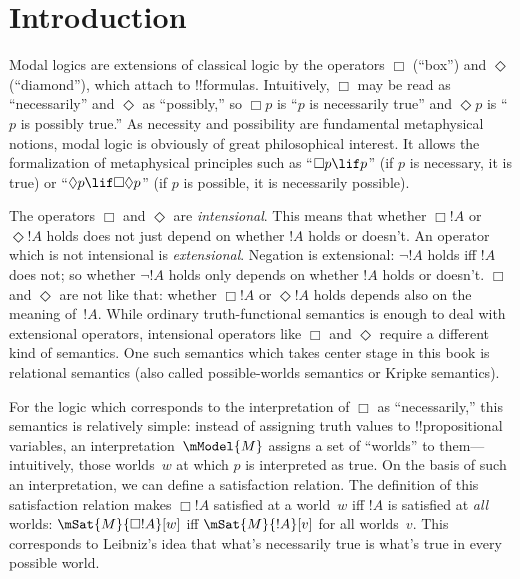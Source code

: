 
\chapter{Introduction}

Modal logics are extensions of classical logic by the operators $\Box$
(``box'') and $\Diamond$ (``diamond''), which attach to !!{formula}s.
Intuitively, $\Box$ may be read as ``necessarily'' and $\Diamond$ as
``possibly,'' so $\Box p$ is ``$p$ is necessarily true'' and $\Diamond
p$ is ``$p$ is possibly true.'' As necessity and possibility are
fundamental metaphysical notions, modal logic is obviously of great
philosophical interest. It allows the formalization of metaphysical
principles such as ``$\Box p \lif p$'' (if $p$ is necessary, it is
true) or ``$\Diamond p \lif \Box\Diamond p$'' (if $p$ is possible,
it is necessarily possible).

The operators $\Box$ and $\Diamond$ are \emph{intensional}. This means
that whether $\Box !A$ or $\Diamond !A$ holds does not just depend on
whether $!A$ holds or doesn't.  An operator which is not intensional
is \emph{extensional}. Negation is extensional: $\lnot !A$ holds iff
$!A$ does not; so whether $\lnot !A$ holds only depends on whether
$!A$ holds or doesn't. $\Box$ and $\Diamond$ are not like that:
whether $\Box !A$ or $\Diamond !A$ holds depends also on the meaning
of~$!A$.  While ordinary truth-functional semantics is enough to deal
with extensional operators, intensional operators like $\Box$ and
$\Diamond$ require a different kind of semantics. One such semantics
which takes center stage in this book is relational semantics (also
called possible-worlds semantics or Kripke semantics). 

For the logic which corresponds to the interpretation of $\Box$ as
``necessarily,'' this semantics is relatively simple: instead of
assigning truth values to !!{propositional variable}s, an
interpretation~$\mModel{M}$ assigns a set of ``worlds'' to
them---intuitively, those worlds~$w$ at which $p$ is interpreted as true.
On the basis of such an interpretation, we can define a satisfaction
relation. The definition of this satisfaction relation makes $\Box !A$ satisfied at a world~$w$ iff $!A$ is
satisfied at \emph{all} worlds: $\mSat{M}{\Box !A}[w]$ iff
$\mSat{M}{!A}[v]$ for all worlds~$v$. This corresponds to Leibniz's
idea that what's necessarily true is what's true in every possible world.

